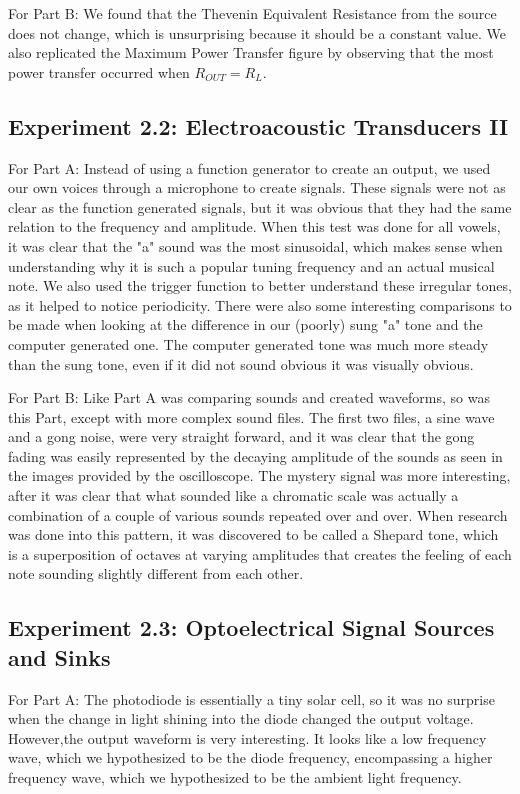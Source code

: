 \documentclass[10pt]{article}
\begin{document}
For Part B: We found that the Thevenin Equivalent Resistance from the source does not change, which is unsurprising because it should be a constant value. We also replicated the Maximum Power Transfer figure by observing that the most power transfer occurred when $R_{OUT} = R_L$. 

\subsection{Experiment 2.2: Electroacoustic Transducers II}
For Part A: Instead of using a function generator to create an output, we used our own voices through a microphone to create signals. These signals were not as clear as the function generated signals, but it was obvious that they had the same relation to the frequency and amplitude. When this test was done for all vowels, it was clear that the "a" sound was the most sinusoidal, which makes sense when understanding why it is such a popular tuning frequency and an actual musical note. We also used the trigger function to better understand these irregular tones, as it helped to notice periodicity. There were also some interesting comparisons to be made when looking at the difference in our (poorly) sung "a" tone and the computer generated one. The computer generated tone was much more steady than the sung tone, even if it did not sound obvious it was visually obvious. 

For Part B: Like Part A was comparing sounds and created waveforms, so was this Part, except with more complex sound files. The first two files, a sine wave and a gong noise, were very straight forward, and it was clear that the gong fading was easily represented by the decaying amplitude of the sounds as seen in the images provided by the oscilloscope. The mystery signal was more interesting, after it was clear that what sounded like a chromatic scale was actually a combination of a couple of various sounds repeated over and over. When research was done into this pattern, it was discovered to be called a Shepard tone, which is a superposition of octaves at varying amplitudes that creates the feeling of each note sounding slightly different from each other.

\subsection{Experiment 2.3: Optoelectrical Signal Sources and Sinks}

For Part A: The photodiode is essentially a tiny solar cell, so it was no surprise when the change in light shining into the diode changed the output voltage. However,the output waveform is very interesting. It looks like a low frequency wave, which we hypothesized to be the diode frequency, encompassing a higher frequency wave, which we hypothesized to be the ambient light frequency.
\end{document}

